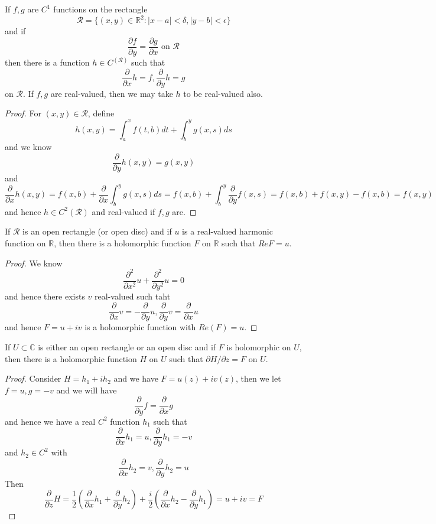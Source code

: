 \documentclass[lang=en, color=blue, ]{elegantbook}
\newcommand{\R}{\mathbb{R}}
\newcommand{\C}{\mathbb{C}}
\newcommand{\ParZ}{\dfrac{\partial}{\partial z}}
\newcommand{\ParX}{\dfrac{\partial}{\partial x}}
\newcommand{\ParY}{\dfrac{\partial}{\partial y}}
\begin{document}
\begin{theorem}
    If $f,g$ are $C^1$ functions on the rectangle
    \[\mathcal{R} = \{(x,y)\in \R^2: |x-a|<\delta, |y-b|<\epsilon\}\]
    and if 
    \[
    \dfrac{\partial f}{\partial y} = \dfrac{\partial g}{\partial x}\text{ on }\mathcal{R}
    \]
    then there is a function $h\in C^(\mathcal{R})$ such that
    \[\ParX h =f, \ParY h = g\]
    on $\mathcal{R}$. If $f,g$ are real-valued, then we may take $h$ to be real-valued also.
\end{theorem}
\begin{proof}\par
    For $(x,y) \in \mathcal{R}$, define
    \[h(x,y) = \int_a^x f(t,b) dt + \int_b^y g(x,s)ds\]
    and we know
    \[
    \ParY h(x,y) = g(x,y)
    \]
    and 
    \[\ParX h(x,y) = f(x,b) + \ParX \int_b^y g(x,s) ds = f(x,b) + \int_b^y \ParY f(x,s) = f(x,b) + f(x,y)-f(x,b) = f(x,y)\]
    and hence $h \in C^2(\mathcal{R})$ and real-valued if $f,g$ are.
\end{proof}

\begin{corollary}
    If $\mathcal{R}$ is an open rectangle (or open disc) and if $u$ is a real-valued harmonic function on $\R$, then there is a holomorphic function $F$ on $\R$ such that $Re F = u$.
\end{corollary}
\begin{proof}\par
    We know 
    \[\dfrac{\partial^2}{\partial x^2} u + \dfrac{\partial^2}{\partial y^2} u =0\]
    and hence there exists $v$ real-valued such taht
    \[\ParX v = - \ParY u, \ParY v = \ParX u\]
    and hence $F = u+iv$ is a holomorphic function with $Re(F) = u$.
\end{proof}

\begin{theorem}
    If $U\subset \C$ is either an open rectangle or an open disc and if $F$ is holomorphic on $U$, then there is a holomorphic function $H$ on $U$ such that $\partial H/\partial z = F$ on $U$. 
\end{theorem}
\begin{proof}\par
    Consider $H = h_1 + ih_2$ and 
    we have $F = u(z) + iv(z)$, then we let $f= u ,g = -v$ and we will have
    \[\ParY f = \ParX g\]
    and hence we have a real $C^2$ function $h_1$ such that
    \[\ParX h_1 = u, \ParY h_1 = -v\]
    and $h_2 \in C^2$ with
    \[\ParX h_2 = v, \ParY h_2 = u\]
    Then
    \[\ParZ H = \dfrac{1}{2}(\ParX h_1 + \ParY h_2)+\dfrac{i}{2}(\ParX h_2 - \ParY h_1) = u+iv = F\]
\end{proof}
\end{document}
